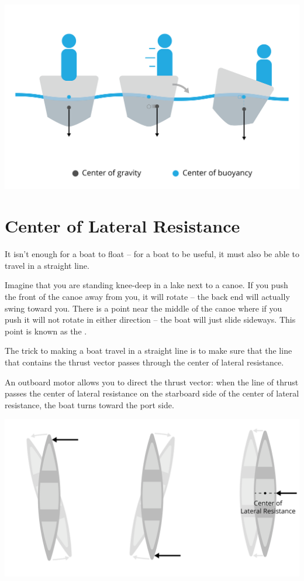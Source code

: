 \includegraphics[width=.75\textwidth]{cgcm.png}


\section{Center of Lateral Resistance}

It isn't enough for a boat to float -- for a boat to be useful,  it must also be able to travel in a straight line.

Imagine that you are standing knee-deep in a lake next to a canoe.  If you push the front of the canoe away from you,  it will rotate -- the back end will actually
swing toward you.   There is a point near the middle of the canoe where if you push it will not rotate in either direction -- the boat will just slide sideways.  This point is known as the .

The trick to making a boat travel in a straight line is to make sure that the line that contains the thrust vector passes through the center of lateral resistance.

An outboard motor allows you to direct the thrust vector: when the line of thrust passes the center of lateral resistance on the starboard side of the center of lateral resistance,  the boat turns toward the port side.

\includegraphics[width=.75\textwidth]{lateralResistance.png}


